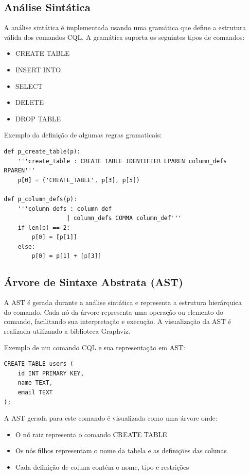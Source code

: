 \documentclass[12pt]{article}
\begin{document}
\subsection{Análise Sintática}
A análise sintática é implementada usando uma gramática que define a estrutura válida dos 
comandos CQL. A gramática suporta os seguintes tipos de comandos:
\begin{itemize}
    \item CREATE TABLE
    \item INSERT INTO
    \item SELECT
    \item DELETE
    \item DROP TABLE
\end{itemize}

Exemplo da definição de algumas regras gramaticais:

\begin{verbatim}
def p_create_table(p):
    '''create_table : CREATE TABLE IDENTIFIER LPAREN column_defs RPAREN'''
    p[0] = ('CREATE_TABLE', p[3], p[5])

def p_column_defs(p):
    '''column_defs : column_def
                  | column_defs COMMA column_def'''
    if len(p) == 2:
        p[0] = [p[1]]
    else:
        p[0] = p[1] + [p[3]]
\end{verbatim}

\subsection{Árvore de Sintaxe Abstrata (AST)}
A AST é gerada durante a análise sintática e representa a estrutura hierárquica do comando. 
Cada nó da árvore representa uma operação ou elemento do comando, facilitando sua interpretação 
e execução. A visualização da AST é realizada utilizando a biblioteca Graphviz.

Exemplo de um comando CQL e sua representação em AST:

\begin{verbatim}
CREATE TABLE users (
    id INT PRIMARY KEY,
    name TEXT,
    email TEXT
);
\end{verbatim}

A AST gerada para este comando é visualizada como uma árvore onde:
\begin{itemize}
    \item O nó raiz representa o comando CREATE TABLE
    \item Os nós filhos representam o nome da tabela e as definições das colunas
    \item Cada definição de coluna contém o nome, tipo e restrições
\end{itemize}
\end{document}
